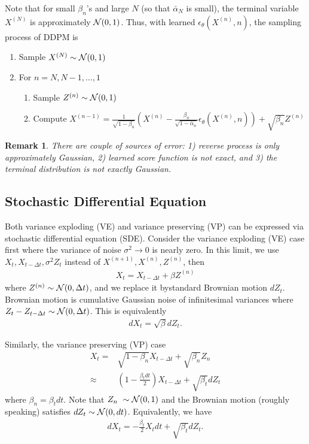 \documentclass[11pt]{article}
\newtheorem{remark}{Remark}
\begin{document}
Note that for small $\beta_n$'s and large $N$ (so that $\bar{\alpha}_N$ is small),
the terminal variable $X^{(N)}$ is approximately ${\cal N}(0, 1)$.
Thus, with learned $\epsilon_\theta(X^{(n)}, n)$, the sampling process of DDPM is 
\begin{enumerate}
    \item Sample $X^{(N)} \sim {\cal N}(0, 1)$
    \item For $n= N, N-1, \dots, 1$
    \begin{enumerate}
        \item Sample $Z^{(n)} \sim {\cal N}(0, 1)$
        \item Compute $X^{(n-1)} = \frac{1}{\sqrt{1-\beta_n}} \left(X^{(n)} - \frac{\beta_n}{\sqrt{1-\bar{\alpha}_n}}\epsilon_\theta(X^{(n)}, n)\right) + \sqrt{\beta_n} Z^{(n)}$
    \end{enumerate}
\end{enumerate}

\begin{remark}
    There are couple of sources of error: 1) reverse process is only approximately Gaussian,
    2) learned score function is not exact, and 3) the terminal distribution is not exactly Gaussian.
\end{remark}

\subsection{Stochastic Differential Equation}
Both variance exploding (VE) and variance preserving (VP) can be expressed via stochastic differential equation (SDE).
Consider the variance exploding (VE) case first where the variance of noise $\sigma^2\rightarrow 0$ is nearly zero.
In this limit, we use $X_t, X_{t-\Delta t}, \sigma^2 Z_t$ instead of $X^{(n+1)}, X^{(n)}, Z^{(n)}$, then
\begin{align}
    X_{t} = X_{t-\Delta t} + \beta Z^{(n)}
\end{align}
where $Z^{(n)}\sim {\cal N}(0, \Delta t)$, and we replace it bystandard Brownian motion $dZ_t$.
Brownian motion is cumulative Gaussian noise of infinitesimal variances where $Z_t-Z_{t-\Delta t}\sim {\cal N}(0, \Delta t)$.
This is equivalently
\begin{align}
    dX_{t} = \sqrt{\beta} dZ_t.
\end{align}

Similarly, the variance preserving (VP) case 
\begin{align}
    X_{t} =& \sqrt{1-\beta_n}X_{t-\Delta t} + \sqrt{\beta_n}Z_n\\
    \approx& \left(1-\frac{\beta_t dt}{2}\right)X_{t-\Delta t} + \sqrt{\beta_t} dZ_t
\end{align}
where $\beta_n = \beta_t dt$.
Note that $Z_n~\sim {\cal N}(0, 1)$ and the Brownian motion (roughly speaking) satisfies $dZ_t\sim{\cal N}(0, dt)$.
Equivalently, we have
\begin{align}
    dX_{t} = -\frac{\beta_t}{2} X_t dt + \sqrt{\beta_t}dZ_t.
\end{align}
\end{document}
